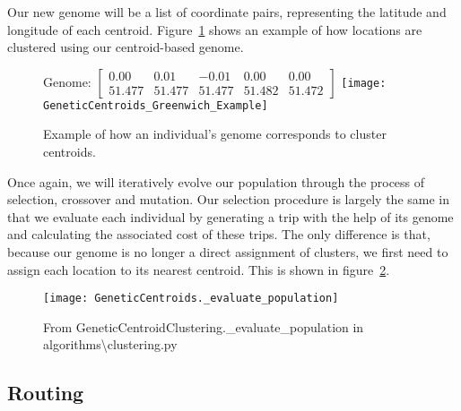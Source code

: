\noindent
Our new genome will be a list of coordinate pairs, representing the latitude and longitude of each centroid.
Figure~\ref{fig:GeneticCentroids_Greenwich_Example} shows an example of how locations are clustered using our centroid-based genome.
\begin{figure}[H]
    \centering
    Genome: $\begin{bmatrix}0.00 & 0.01 & -0.01 & 0.00 & 0.00\\51.477 & 51.477 & 51.477 & 51.482 & 51.472\end{bmatrix}$
    \texttt{[image: GeneticCentroids\_Greenwich\_Example]}
    \caption{Example of how an individual's genome corresponds to cluster centroids.}
    \label{fig:GeneticCentroids_Greenwich_Example}
\end{figure}

\noindent
Once again, we will iteratively evolve our population through the process of selection, crossover and mutation.
Our selection procedure is largely the same in that we evaluate each individual by generating a trip with the help
of its genome and calculating the associated cost of these trips.
The only difference is that, because our genome is no longer a direct assignment of clusters, we first need to
assign each location to its nearest centroid.
This is shown in figure~\ref{fig:GeneticCentroids._evaluate_population}.
\begin{figure}
    \centering
    \texttt{[image: GeneticCentroids.\_evaluate\_population]}
    \caption{From GeneticCentroidClustering.\_evaluate\_population in algorithms\textbackslash clustering.py}
    \label{fig:GeneticCentroids._evaluate_population}
\end{figure}

\noindent


\subsection{Routing}\label{subsec:routing}
